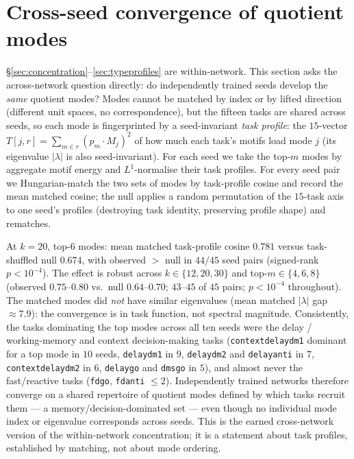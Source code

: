 \documentclass[11pt]{article}
\begin{document}
\section{Cross-seed convergence of quotient modes}
\label{sec:crossseed}
\S\ref{sec:concentration}--\ref{sec:typeprofiles} are within-network. This section asks the
across-network question directly: do independently trained seeds develop the \emph{same} quotient
modes? Modes cannot be matched by index or by lifted direction (different unit spaces, no
correspondence), but the fifteen tasks are shared across seeds, so each mode is fingerprinted by a
seed-invariant \emph{task profile}: the $15$-vector $T[j,r]=\sum_{m\in r}(p_m\!\cdot\!M_j)^2$ of how
much each task's motifs load mode $j$ (its eigenvalue $\lvert\lambda\rvert$ is also seed-invariant).
For each seed we take the top-$m$ modes by aggregate motif energy and $L^1$-normalise their task
profiles. For every seed pair we Hungarian-match the two sets of modes by task-profile cosine and
record the mean matched cosine; the null applies a random permutation of the $15$-task axis to one
seed's profiles (destroying task identity, preserving profile shape) and rematches.

At $k=20$, top-$6$ modes: mean matched task-profile cosine $0.781$ versus task-shuffled null
$0.674$, with observed $>$ null in $44/45$ seed pairs (signed-rank $p<10^{-4}$). The effect is
robust across $k\in\{12,20,30\}$ and top-$m\in\{4,6,8\}$ (observed $0.75$--$0.80$ vs.\ null
$0.64$--$0.70$; $43$--$45$ of $45$ pairs; $p<10^{-4}$ throughout). The matched modes did \emph{not}
have similar eigenvalues (mean matched $\lvert\lambda\rvert$ gap $\approx7.9$): the convergence is
in task function, not spectral magnitude. Consistently, the tasks dominating the top modes across
all ten seeds were the delay / working-memory and context decision-making tasks
(\texttt{contextdelaydm1} dominant for a top mode in $10$ seeds, \texttt{delaydm1} in $9$,
\texttt{delaydm2} and \texttt{delayanti} in $7$, \texttt{contextdelaydm2} in $6$, \texttt{delaygo}
and \texttt{dmsgo} in $5$), and almost never the fast/reactive tasks (\texttt{fdgo}, \texttt{fdanti}
$\leq2$). Independently trained networks therefore converge on a shared repertoire of quotient
modes defined by which tasks recruit them --- a memory/decision-dominated set --- even though no
individual mode index or eigenvalue corresponds across seeds. This is the earned cross-network
version of the within-network concentration; it is a statement about task profiles, established by
matching, not about mode ordering.
\end{document}
